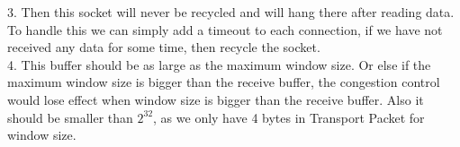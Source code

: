 \documentclass[paper=a4, fontsize=11pt]{scrartcl} %
\numberwithin{equation}{section} %
\numberwithin{figure}{section} %
\numberwithin{table}{section} %
\begin{document}
3. Then this socket will never be recycled and will hang there after reading data. To handle this we can simply add a timeout to each connection, if we have not received any data for some time, then recycle the socket.\\

4. This buffer should be as large as the maximum window size. Or else if the maximum window size is bigger than the receive buffer, the congestion control would lose effect when window size is bigger than the receive buffer. Also it should be smaller than $2^{32}$, as we only have 4 bytes in Transport Packet for window size.



\end{document}
